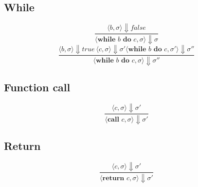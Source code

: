 \documentclass[12pt]{article}
\begin{document}
            \subsection{While}
                \begin{equation}  
                    \frac{\langle b, \sigma \rangle\Downarrow false }
                    {\langle \textbf{while } b \textbf{ do } c, \sigma \rangle\Downarrow \sigma}
                \end{equation}
                \begin{equation}  
                    \frac{\langle b, \sigma \rangle\Downarrow true \: \langle c, \sigma \rangle\Downarrow \sigma' \langle \textbf{while } b \textbf{ do } c, \sigma' \rangle\Downarrow \sigma'' }
                    {\langle \textbf{while } b \textbf{ do } c, \sigma \rangle\Downarrow \sigma''}
                \end{equation}
                
            \subsection{Function call}
                \begin{equation}  
                    \frac{\langle c, \sigma \rangle\Downarrow \sigma' }
                    {\langle \textbf{call } c, \sigma \rangle\Downarrow \sigma'}
                \end{equation}
                
            \subsection{Return}
                \begin{equation}  
                    \frac{\langle c, \sigma \rangle\Downarrow \sigma' }
                    {\langle \textbf{return } c, \sigma \rangle\Downarrow \sigma'}
                \end{equation}
    
\end{document}

